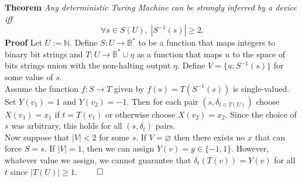 \documentclass[11pt]{article}
\newcommand{\N}{\mathbb{N}}
\newcommand{\B}{\mathbb{B}}
\let\emptyset\varnothing
\begin{document}
\pagebreak
\textbf{Theorem} \quad \textit{Any deterministic Turing Machine can be strongly inferred by a device iff} 
$$\forall s \in S(U),\; |S^{-1}(s)| \geq 2. $$ 
\textbf{Proof} \quad Let $ U := \N $. Define $ S: U \rightarrow \B^{*} $ to be a function that maps integers to binary bit strings and $ T: U \rightarrow \B^{*} \cup \eta$ as a function that maps $u$ to the space of bits strings union with the non-halting output $ \eta $. Define $ V = \{u : S^{-1}(s) \} $ for some value of $ s $. \\

Assume the function $ f: S \rightarrow T $ given by $ f(s) = T(S^{-1}(s)) $ is single-valued. Set $ Y(v_{1}) = 1 $ and $ Y(v_{2}) = -1 $. Then for each pair $ (s, \delta_{t \in T(U)} ) $ choose $ X(v_{1}) = x_1 $ if $ t = T(v_1) $ or otherwise choose $ X(v_2) = x_2 $. Since the choice of $ s $ was arbitrary, this holds for all $ (s, \delta_t) $ pairs. \\



Now suppose that $|V| < 2$ for some $ s $. If $ V = \emptyset $ then there exists no $ x $ that can force $ S = s $. If $ |V| = 1 $, then we can assign $ Y(v) = y \in \{-1, 1\} $. However, whatever value we assign, we cannot guarantee that $ \delta_{t}(T(v)) = Y(v) $ for all $ t $ since $ |T(U)| \geq 1 $. $ \hfill \qed $




%
%


%
\end{document}
